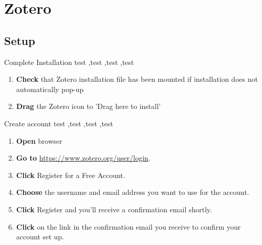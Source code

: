 \documentclass[10pt,a4paper]{article}
\begin{document}
\section{Zotero}
\subsection{Setup}
\begin{textbox}{Complete Installation}
test  \sep test \sep test \sep test

\bigskip

\begin{enumerate}
\item \textbf{Check} that Zotero installation file has been mounted if installation does not automatically pop-up
\item \textbf{Drag} the Zotero icon to 'Drag here to install'
\end{enumerate}

\end{textbox}

\begin{textbox}{Create account}
test  \sep test \sep test \sep test

\bigskip

\begin{enumerate}
\item \textbf{Open} browser
\item \textbf{Go to}  \href{https://www.zotero.org/user/login}{https://www.zotero.org/user/login}. 
\item \textbf{Click} Register for a Free Account.
\item \textbf{Choose} the username and email address you want to use for the account. 
\item \textbf{Click} Register and you’ll receive a confirmation email shortly. 
\item \textbf{Click} on the link in the confirmation email you receive to confirm your account set up.
\end{enumerate}

\end{textbox}
\end{document}

